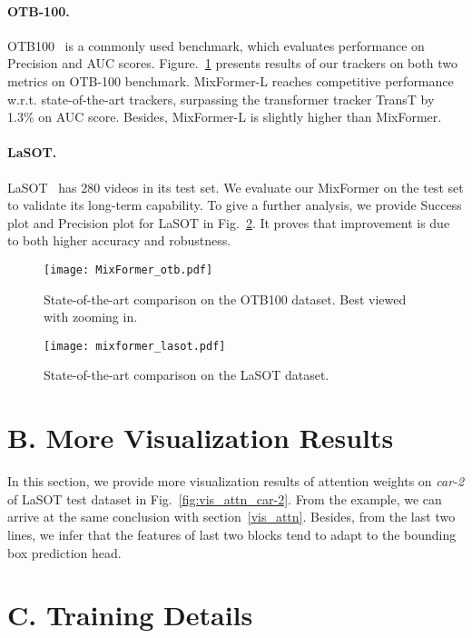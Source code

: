 \paragraph{OTB-100.}
OTB100~\cite{otb} is a commonly used benchmark, which evaluates performance on Precision and AUC scores. Figure.~\ref{fig:otb} presents results of our trackers on both two metrics on OTB-100 benchmark. MixFormer-L reaches competitive performance w.r.t. state-of-the-art trackers, surpassing the transformer tracker TransT by 1.3\% on AUC score. Besides, MixFormer-L is slightly higher than MixFormer.

\paragraph{LaSOT.}
LaSOT~\cite{lasot} has 280 videos in its test set. We evaluate our MixFormer on the test set to validate its long-term capability. To give a further analysis, we provide Success plot and Precision plot for LaSOT in Fig.~\ref{fig:lasot}. It proves that improvement is due to both higher accuracy and robustness. 

\begin{figure}[pb]
\centering
\texttt{[image: MixFormer\_otb.pdf]}
\caption{State-of-the-art comparison on the OTB100 dataset. Best viewed with zooming in.}
\label{fig:otb}
\end{figure}

\begin{figure}[pt]
\centering
\texttt{[image: mixformer\_lasot.pdf]}
\vspace{-8mm}
\caption{State-of-the-art comparison on the LaSOT dataset.}
\vspace{-5mm}
\label{fig:lasot}
\end{figure}

\section*{B. More Visualization Results}
In this section, we provide more visualization results of attention weights on \textit{car-2} of LaSOT test dataset in Fig.~\ref{fig:vis_attn_car-2}. From the example, we can arrive at the same conclusion with section~\ref{vis_attn}. Besides, from the last two lines, we infer that the features of last two blocks tend to adapt to the bounding box prediction head.

\section*{C. Training Details}

